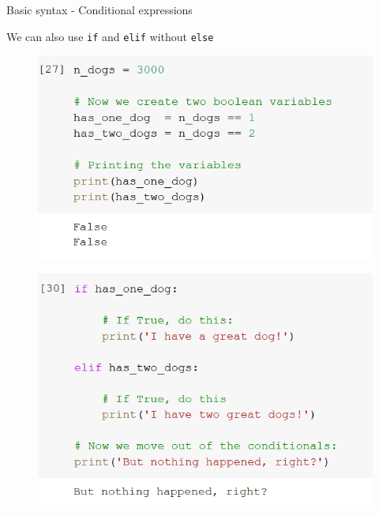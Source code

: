 \documentclass[aspectratio=169]{beamer}
\begin{document}
\begin{frame}{Basic syntax - Conditional expressions}

	We can also use \texttt{if} and \texttt{elif} without \texttt{else}

	\begin{multicols}{2}

		\begin{figure}
			\centering
			\includegraphics[width=\linewidth]{img/boolean_variables.png}
		\end{figure}
		\begin{figure}
			\centering
			\includegraphics[width=\linewidth]{img/if_elif.png}
		\end{figure}

	\end{multicols}

\end{frame}
\end{document}
